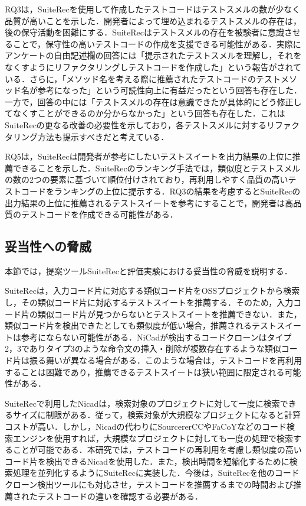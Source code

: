 \documentclass[12pt]{jarticle} %
\begin{document}
RQ3は，{\sf SuiteRec}を使用して作成したテストコードはテストスメルの数が少なく品質が高いことを示した．開発者によって埋め込まれるテストスメルの存在は，後の保守活動を困難にする．{\sf SuiteRec}はテストスメルの存在を被験者に意識させることで，保守性の高いテストコードの作成を支援できる可能性がある．実際にアンケートの自由記述欄の回答には「提示されたテストスメルを理解し，それをなくすようにリファクタリングしテストコードを作成した」という報告がされている．さらに，「メソッド名を考える際に推薦されたテストコードのテストメソッド名が参考になった」という可読性向上に有益だったという回答も存在した．一方で，回答の中には「テストスメルの存在は意識できたが具体的にどう修正してなくすことができるのか分からなかった」という回答も存在した．これは{\sf SuiteRec}の更なる改善の必要性を示しており，各テストスメルに対するリファクタリング方法も提示すべきだと考えている．

RQ5は，{\sf SuiteRec}は開発者が参考にしたいテストスイートを出力結果の上位に推薦できることを示した．{\sf SuiteRec}のランキング手法では，類似度とテストスメルの数の2つの要素に基づいて順位付けされており，再利用しやすく品質の高いテストコードをランキングの上位に提示する．RQ3の結果を考慮すると{\sf SuiteRec}の出力結果の上位に推薦されるテストスイートを参考にすることで，開発者は高品質のテストコードを作成できる可能性がある．

\subsection{妥当性への脅威}

本節では，提案ツール{\sf SuiteRec}と評価実験における妥当性の脅威を説明する．

{\sf SuiteRec}は，入力コード片に対応する類似コード片をOSSプロジェクトから検索し，その類似コード片に対応するテストスイートを推薦する．そのため，入力コード片の類似コード片が見つからないとテストスイートを推薦できない．また，類似コード片を検出できたとしても類似度が低い場合，推薦されるテストスイートは参考にならない可能性がある．{\sf NiCad}が検出するコードクローンはタイプ2，3でありタイプ3のような命令文の挿入・削除が複数存在するような類似コード片は振る舞いが異なる場合がある．このような場合は，テストコードを再利用することは困難であり，推薦できるテストスイートは狭い範囲に限定される可能性がある．

{\sf SuiteRec}で利用した{\sf Nicad}は，検索対象のプロジェクトに対して一度に検索できるサイズに制限がある．従って，検索対象が大規模なプロジェクトになると計算コストが高い．しかし，{\sf Nicad}の代わりに{\sf SourcererCC}\cite{SourcererCC}や{\sf FaCoY}\cite{FaCoY}などのコード検索エンジンを使用すれば，大規模なプロジェクトに対しても一度の処理で検索することが可能である．本研究では，テストコードの再利用を考慮し類似度の高いコード片を検出できる{\sf Nicad}を使用した．また，検出時間を短縮化するために検索処理を並列化するように{\sf SuiteRec}に実装した．今後は，{\sf SuiteRec}を他のコードクローン検出ツールにも対応させ，テストコードを推薦するまでの時間および推薦されたテストコードの違いを確認する必要がある．
\end{document}
